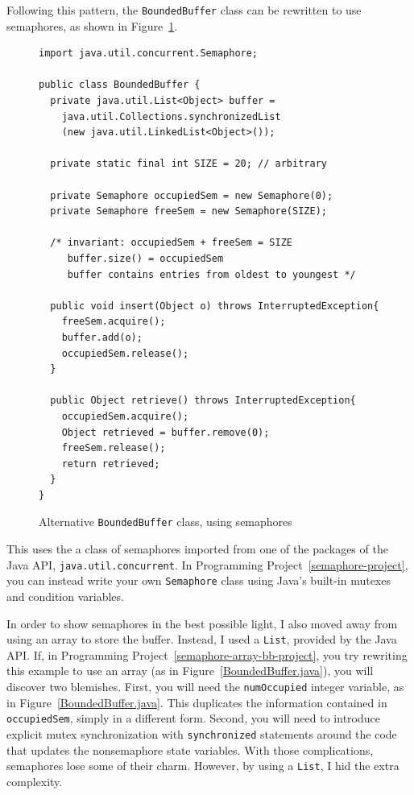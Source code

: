 Following this pattern, the \verb|BoundedBuffer| class can be
  rewritten to use
semaphores, as shown in Figure~\ref{SemaphoreBoundedBuffer.java}.
\begin{figure}
\begin{verbatim}
import java.util.concurrent.Semaphore;

public class BoundedBuffer {
  private java.util.List<Object> buffer =
    java.util.Collections.synchronizedList
    (new java.util.LinkedList<Object>());

  private static final int SIZE = 20; // arbitrary

  private Semaphore occupiedSem = new Semaphore(0);
  private Semaphore freeSem = new Semaphore(SIZE);

  /* invariant: occupiedSem + freeSem = SIZE
     buffer.size() = occupiedSem
     buffer contains entries from oldest to youngest */

  public void insert(Object o) throws InterruptedException{
    freeSem.acquire();
    buffer.add(o);
    occupiedSem.release();
  }

  public Object retrieve() throws InterruptedException{
    occupiedSem.acquire();
    Object retrieved = buffer.remove(0);
    freeSem.release();
    return retrieved;
  }
}
\end{verbatim}
\caption{Alternative {\tt BoundedBuffer} class, using semaphores}
\label{SemaphoreBoundedBuffer.java}
\end{figure}
This uses the a class of semaphores imported from one of the
packages of the Java API, \texttt{java.util.concurrent}.
In
Programming Project~\ref{semaphore-project}, you can instead write your own {\tt Semaphore} class using Java's built-in mutexes and
condition variables.

In order to show semaphores in the best possible light, I also moved
away from using an array to store the buffer.  Instead, I used a
\texttt{List}, provided by the Java API.  If, in Programming Project~\ref{semaphore-array-bb-project}, you try rewriting
this example to use an array (as in Figure~\ref{BoundedBuffer.java}),
you will discover two blemishes.  First, you will need the
\verb|numOccupied| integer variable, as in Figure~\ref{BoundedBuffer.java}.  This duplicates the information contained in
\verb|occupiedSem|, simply in a different form.  Second, you will need
to introduce explicit mutex synchronization with \verb|synchronized|
statements around the code that updates the nonsemaphore state
variables.  With those complications, semaphores lose some of their
charm.  However, by using a \texttt{List}, I hid the extra complexity.

